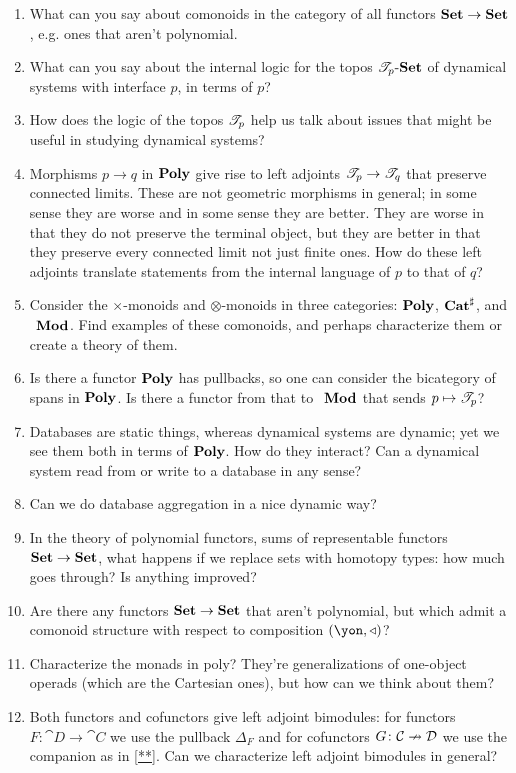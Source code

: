 \documentclass[Book-Poly]{subfiles}
\begin{document}
\begin{enumerate}
  \item What can you say about comonoids in the category of all functors $\textbf{Set}\to\textbf{Set}$, e.g. ones that aren't polynomial.
  \item What can you say about the internal logic for the topos $\mathscr{T}_{p}\textnormal{-}\textbf{Set}$ of dynamical systems with interface $p$, in terms of $p$?
  \item How does the logic of the topos $\mathscr{T}_{p}$ help us talk about issues that might be useful in studying dynamical systems?
  \item Morphisms $p\to q$ in $\textbf{Poly}$ give rise to left adjoints $\mathscr{T}_{p}\to\mathscr{T}_{q}$ that preserve connected limits. These are not geometric morphisms in general; in some sense they are worse and in some sense they are better. They are worse in that they do not preserve the terminal object, but they are better in that they preserve every connected limit not just finite ones. How do these left adjoints translate statements from the internal language of $p$ to that of $q$?
  \item Consider the $\times$-monoids and $\otimes$-monoids in three categories: $\textbf{Poly}$, $\textbf{Cat}^\sharp$, and $~_{}\textbf{Mod}_{}$. Find examples of these comonoids, and perhaps characterize them or create a theory of them.
  \item Is there a functor $\textbf{Poly}$ has pullbacks, so one can consider the bicategory of spans in $\textbf{Poly}$. Is there a functor from that to $~_{}\textbf{Mod}_{}$ that sends $p\mapsto\mathscr{T}_{p}$?
  \item Databases are static things, whereas dynamical systems are dynamic; yet we see them both in terms of $\textbf{Poly}$. How do they interact? Can a dynamical system read from or write to a database in any sense?
  \item Can we do database aggregation in a nice dynamic way?
  \item In the theory of polynomial functors, sums of representable functors $\textbf{Set}\to\textbf{Set}$, what happens if we replace sets with homotopy types: how much goes through? Is anything improved?
  \item Are there any functors $\textbf{Set}\to\textbf{Set}$ that aren't polynomial, but which admit a comonoid structure with respect to composition $(\yon,\tri)$?
  \item Characterize the monads in poly? They're generalizations of one-object operads (which are the Cartesian ones), but how can we think about them?
  \item Both functors and cofunctors give left adjoint bimodules: for functors $F\colon\cat{D}\to\cat{C}$ we use the pullback $\Delta_F$ and for cofunctors $G\colon\mathcal{C}\nrightarrow\mathcal{D}$ we use the companion as in \cref{**}. Can we characterize left adjoint bimodules in general?

\end{enumerate}
\end{document}
